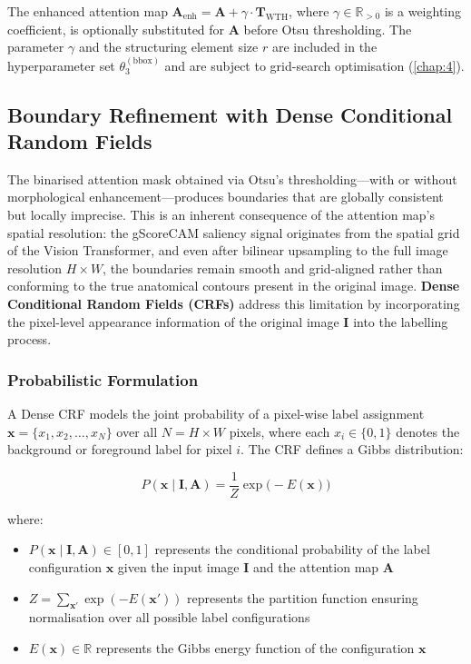 The enhanced attention map $\mathbf{A}_{\text{enh}} = \mathbf{A} + \gamma \cdot \mathbf{T}_{\text{WTH}}$, where $\gamma \in \mathbb{R}_{>0}$ is a weighting coefficient, is optionally substituted for $\mathbf{A}$ before Otsu thresholding. The parameter $\gamma$ and the structuring element size $r$ are included in the hyperparameter set $\theta_3^{(\text{bbox})}$ and are subject to grid-search optimisation (\ref{chap:4}).


\subsection{Boundary Refinement with Dense Conditional Random Fields}
\label{sec:3_4_3}

The binarised attention mask obtained via Otsu's thresholding---with or without morphological enhancement---produces boundaries that are globally consistent but locally imprecise. This is an inherent consequence of the attention map's spatial resolution: the gScoreCAM saliency signal originates from the spatial grid of the Vision Transformer, and even after bilinear upsampling to the full image resolution $H \times W$, the boundaries remain smooth and grid-aligned rather than conforming to the true anatomical contours present in the original image. \textbf{Dense Conditional Random Fields (CRFs)} address this limitation by incorporating the pixel-level appearance information of the original image $\mathbf{I}$ into the labelling process.

\subsubsection{Probabilistic Formulation}

A Dense CRF models the joint probability of a pixel-wise label assignment $\mathbf{x} = \{x_1, x_2, \ldots, x_N\}$ over all $N = H \times W$ pixels, where each $x_i \in \{0, 1\}$ denotes the background or foreground label for pixel $i$. The CRF defines a Gibbs distribution:

\begin{equation}
P(\mathbf{x} \mid \mathbf{I}, \mathbf{A}) = \frac{1}{Z} \exp\!\bigl(-E(\mathbf{x})\bigr)
\end{equation}

where:
\begin{itemize}
\item $P(\mathbf{x} \mid \mathbf{I}, \mathbf{A}) \in [0,1]$ represents the conditional probability of the label configuration $\mathbf{x}$ given the input image $\mathbf{I}$ and the attention map $\mathbf{A}$
\item $Z = \sum_{\mathbf{x}'} \exp(-E(\mathbf{x}'))$ represents the partition function ensuring normalisation over all possible label configurations
\item $E(\mathbf{x}) \in \mathbb{R}$ represents the Gibbs energy function of the configuration $\mathbf{x}$
\end{itemize}


